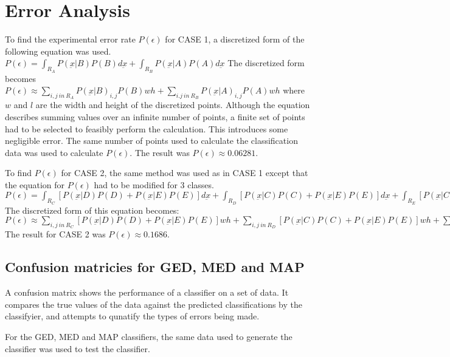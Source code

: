 \section{Error Analysis}
To find the experimental error rate $P(\epsilon)$ for CASE 1, a discretized form of the following equation was used.
$P(\epsilon)=\int_{R_A}P(\underbar x|B)P(B)d\underbar x +
             \int_{R_B}P(\underbar x|A)P(A)d\underbar x$
The discretized form becomes
$P(\epsilon)\approx\sum_{i,j\ in\ R_A}P(\underbar x|B)_{i,j}P(B)wh +
                   \sum_{i.j\ in\ R_B}P(\underbar x|A)_{i,j}P(A)wh$
where $w$ and $l$ are the width and height of the discretized points. Although the equation describes summing values over an infinite number of points, a finite set of points had to be selected to feasibly perform the calculation. This introduces some negligible error. The same number of points used to calculate the classification data was used to calculate $P(\epsilon)$. The result was $P(\epsilon)\approx0.06281$.

To find $P(\epsilon)$ for CASE 2, the same method was used as in CASE 1 except that the equation for $P(\epsilon)$ had to be modified for 3 classes.
$P(\epsilon)=\int_{R_C}[P(\underbar x|D)P(D)+P(\underbar x|E)P(E)]d\underbar x +
             \int_{R_D}[P(\underbar x|C)P(C)+P(\underbar x|E)P(E)]d\underbar x +
             \int_{R_E}[P(\underbar x|C)P(C)+P(\underbar x|D)P(D)]d\underbar x$
The discretized form of this equation becomes:
$P(\epsilon)\approx\sum_{i,j\ in\ R_C}[P(\underbar x|D)P(D)+P(\underbar x|E)P(E)]wh +
                   \sum_{i,j\ in\ R_D}[P(\underbar x|C)P(C)+P(\underbar x|E)P(E)]wh +
                   \sum_{i,j\ in\ R_E}[P(\underbar x|C)P(C)+P(\underbar x|D)P(D)]wh$
The result for CASE 2 was $P(\epsilon)\approx0.1686$.
 
\subsection{Confusion matricies for GED, MED and MAP}

A confusion matrix shows the performance of a classifier on a set of data. It compares the true values of the data against the predicted classifications by the classifyier, and attempts to qunatify the types of errors being made.

For the GED, MED and MAP classifiers, the same data used to generate the classifier was used to test the classifier.

\clearpage


